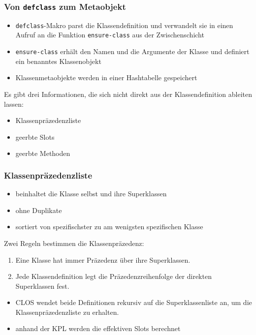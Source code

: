 \documentclass{beamer}
\begin{document}
\begin{frame}
 \frametitle{Von \texttt{defclass} zum Metaobjekt}
 \begin{itemize}
  \item \texttt{defclass}-Makro parst die Klassendefinition und verwandelt sie in einen Aufruf an die Funktion \texttt{ensure-class} aus der Zwischenschicht
  \item \texttt{ensure-class} erhält den Namen und die Argumente der Klasse und definiert ein benanntes Klassenobjekt
  \item Klassenmetaobjekte werden in einer Hashtabelle gespeichert
 \end{itemize}
 \vspace{0.5cm}
Es gibt drei Informationen, die sich nicht direkt aus der Klassendefinition ableiten lassen:
 \begin{itemize}
  \item Klassenpräzedenzliste
  \item geerbte Slots
  \item geerbte Methoden
 \end{itemize}
\end{frame}

\begin{frame}
 \frametitle{Klassenpräzedenzliste}
 \begin{itemize}
  \item beinhaltet die Klasse selbst und ihre Superklassen
  \item ohne Duplikate
  \item sortiert von spezifischster zu am wenigsten spezifischen Klasse
 \end{itemize}
 \vspace{0.5cm}
 Zwei Regeln bestimmen die Klassenpräzedenz:
\begin{enumerate}
 \item Eine Klasse hat immer Präzedenz über ihre Superklassen.
 \item Jede Klassendefinition legt die Präzedenzreihenfolge der direkten Superklassen fest.
\end{enumerate}
 \vspace{0.5cm}
 \begin{itemize}
  \item[\textbf{\textrightarrow}] CLOS wendet beide Definitionen rekursiv auf die Superklassenliste an, um die Klassenpräzedenzliste zu erhalten.
  \item anhand der KPL werden die effektiven Slots berechnet
 \end{itemize}
\end{frame}
\end{document}
